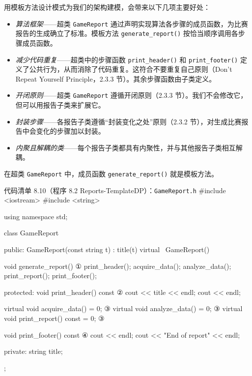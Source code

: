 用模板方法设计模式为我们的架构建模，会带来以下几项主要好处：

\begin{itemize}
\item \emph{算法框架}——超类 \texttt{Game\allowbreak{}Report} 通过声明实现算法各步骤的成员函数，为比赛报告的生成确立了标准。模板方法 \texttt{generate\_\allowbreak{}report(\allowbreak{})\allowbreak{}} 按恰当顺序调用各步骤成员函数。
\item \emph{减少代码重复}——超类中的步骤函数 \texttt{print\_\allowbreak{}header(\allowbreak{})\allowbreak{}} 和 \texttt{print\_\allowbreak{}footer(\allowbreak{})\allowbreak{}} 定义了公共行为，从而消除了代码重复。这符合不要重复自己原则（Don’t Repeat Yourself Principle，2.3.3 节）。其余步骤函数由子类定义。
\item \emph{开闭原则}——超类 \texttt{Game\allowbreak{}Report} 遵循开闭原则（2.3.3 节）。我们不会修改它，但可以用报告子类来扩展它。
\item \emph{封装步骤}——各报告子类遵循“封装变化之处”原则（2.3.2 节），对生成比赛报告中会变化的步骤加以封装。
\item \emph{内聚且解耦的类}——每个报告子类都具有内聚性，并与其他报告子类相互解耦。
\end{itemize}

在超类 \texttt{Game\allowbreak{}Report} 中，成员函数 \texttt{generate\_\allowbreak{}report(\allowbreak{})\allowbreak{}} 就是模板方法。

\begin{codeboxt}{代码清单 8.10（程序 8.2 Reports-TemplateDP）：\texttt{Game\allowbreak{}Report.\allowbreak{}h}}
#include <iostream>
#include <string>

using namespace std;

class GameReport
{
public:
    GameReport(const string t) : title(t) {}
    virtual ~GameReport() {}

    void generate_report()                 ①
    {
        print_header();
        acquire_data();
        analyze_data();
        print_report();
        print_footer();
    }

protected:
    void print_header() const              ②
    {
        cout << title << endl;
        cout << endl;
    }

    virtual void acquire_data() = 0;       ③
    virtual void analyze_data() = 0;       ③
    virtual void print_report() const = 0; ③

    void print_footer() const              ④
    {
        cout << endl;
        cout << "End of report" << endl;
    }

private:
    string title;
};
\end{codeboxt}
\par
{}\par
{}\par
{}\par

